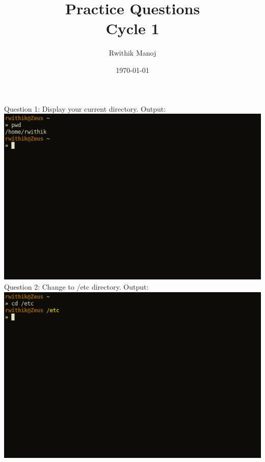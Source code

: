 \documentclass[10pt,a4paper,titlepage]{report}
\begin{document}
\begin{titlepage}
\author{Rwithik Manoj}
\title{Practice Questions\\Cycle 1}
\date{\today}
\maketitle
\end{titlepage}
\pagebreak
\newline
Question 1: Display your current directory.\newline
Output:\newline
\includegraphics[scale=.5]{../Images/Cycle2/1.png}\newline
\newline
Question 2: Change to /etc directory.\newline
Output:\newline
\includegraphics[scale=.5]{../Images/Cycle2/2.png}
\pagebreak
\newline
\end{document}
